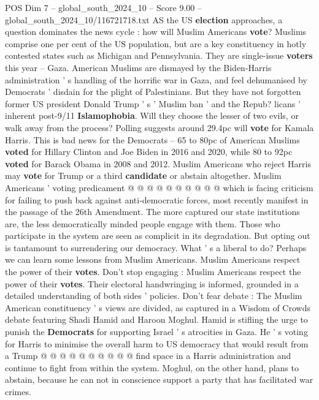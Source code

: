 \begin{textsample}{POS Dim 7 – global\_south\_2024\_10 – Score 9.00 – global\_south\_2024\_10/116721718.txt}  \label{ex:f7_pos_221}
AS the US \textbf{election} approaches, a question dominates the news cycle : how will Muslim Americans \textbf{vote}?
Muslims comprise one per cent of the US population, but are a key constituency in hotly contested states such as Michigan and Pennsylvania.
They are single-issue \textbf{voters} this year -- Gaza.
American Muslims are dismayed by the Biden-Harris administration ' s handling of the horrific war in Gaza, and feel dehumanised by Democrats ' disdain for the plight of Palestinians.
But they have not forgotten former US president Donald Trump ' s ' Muslim ban ' and the Repub? licans ' inherent post-9/11 \textbf{Islamophobia}.
Will they choose the lesser of two evils, or walk away from the process?
Polling suggests around 29.4pc will \textbf{vote} for Kamala Harris.
This is bad news for the Democrats -- 65 to 80pc of American Muslims \textbf{voted} for Hillary Clinton and Joe Biden in 2016 and 2020, while 80 to 92pc \textbf{voted} for Barack Obama in 2008 and 2012.
Muslim Americans who reject Harris may \textbf{vote} for Trump or a third \textbf{candidate} or abstain altogether.
Muslim Americans ' voting predicament @ @ @ @ @ @ @ @ @ @ which is facing criticism for failing to push back against anti-democratic forces, most recently manifest in the passage of the 26th Amendment.
The more captured our state institutions are, the less democratically minded people engage with them.
Those who participate in the system are seen as complicit in its degradation.
But opting out is tantamount to surrendering our democracy.
What ' s a liberal to do?
Perhaps we can learn some lessons from Muslim Americans.
Muslim Americans respect the power of their \textbf{votes}.
Don't stop engaging : Muslim Americans respect the power of their \textbf{votes}.
Their electoral handwringing is informed, grounded in a detailed understanding of both sides ' policies.
Don't fear debate : The Muslim American constituency ' s views are divided, as captured in a Wisdom of Crowds debate featuring Shadi Hamid and Haroon Moghul.
Hamid is stifling the urge to punish the \textbf{Democrats} for supporting Israel ' s atrocities in Gaza.
He ' s voting for Harris to minimise the overall harm to US democracy that would result from a Trump @ @ @ @ @ @ @ @ @ @ find space in a Harris administration and continue to fight from within the system.
Moghul, on the other hand, plans to abstain, because he can not in conscience support a party that has facilitated war crimes.

\end{textsample}
